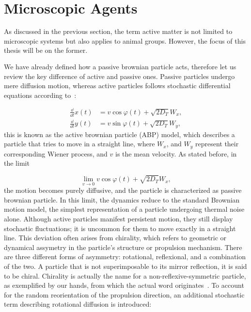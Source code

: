 \section{Microscopic Agents}

As discussed in the previous section, the term active matter is not limited to microscopic systems but also applies to animal groups. However, the focus of this thesis will be on the former.

We have already defined how a passive brownian particle acts, therefore let us review the key difference of active and passive ones. Passive particles undergo mere diffusion motion, whereas active particles follows stochastic differential equations according to~\cite{volpe2014simulation}: 

\begin{align}
  \frac{\dd}{\dd t}x(t) &= v\cos{\varphi(t)} + \sqrt{2D_T}W_x,\\
  \frac{\dd}{\dd t}y(t) &= v\sin{\varphi(t)} + \sqrt{2D_T}W_y,
  \label{eq:activestochasticequation}
\end{align}
this is known as the active brownian particle (ABP) model, which describes a particle that tries to move in a straight line, where $W_x$, and $W_y$ represent their corresponding Wiener process, and $v$ is the mean velocity. As stated before, in the limit 

\begin{equation}
  \lim_{v \to 0}  v\cos{\varphi(t)} + \sqrt{2D_T}W_x,
  \label{eq:limitofvelocity}
\end{equation}
the motion becomes purely diffusive, and the particle is characterized as passive brownian particle. In this limit, the dynamics reduce to the standard Brownian motion model, the simplest representation of a particle undergoing thermal noise alone.
Although active particles manifest persistent motion, they still display stochastic fluctuations; it is uncommon for them to move exactly in a straight line. This deviation often arises from chirality, which refers to geometric or dynamical assymetry in the particle's structure or propulsion mechanism. There are three different forms of asymmetry: rotational, reflexional, and a combination of the two. A particle that is not superimposable to its mirror reflection, it is said to be chiral. Chirality is actually the name for a non-reflexive-symmetric particle, as exemplified by our hands, from which the actual word originates~\cite{cahn1966specification}. To account for the random reorientation of the propulsion direction, an additional stochastic term describing rotational diffusion is introduced:

